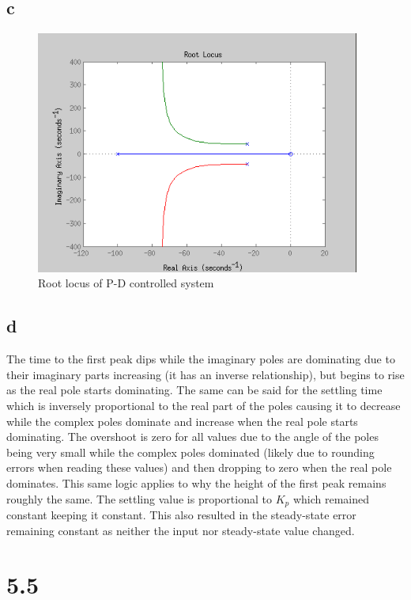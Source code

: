 \documentclass{article}
\begin{document}
\newpage
\subsection*{c} %
\begin{figure}[!htbp]
    \centering
    \includegraphics[width=0.95\textwidth]{5_4_locus.png}
    \caption{Root locus of P-D controlled system}
\end{figure}
\subsection*{d} %
The time to the first peak dips while the imaginary poles are dominating due to their imaginary parts increasing (it has an inverse relationship), but begins to rise as the real pole starts dominating. The same can be said for the settling time which is inversely proportional to the real part of the poles causing it to decrease while the complex poles dominate and increase when the real pole starts dominating. The overshoot is zero for all values due to the angle of the poles being very small while the complex poles dominated (likely due to rounding errors when reading these values) and then dropping to zero when the real pole dominates. This same logic applies to why the height of the first peak remains roughly the same. The settling value is proportional to $K_p$ which remained constant keeping it constant. This also resulted in the steady-state error remaining constant as neither the input nor steady-state value changed.
\newpage
\section*{5.5} %
\end{document}
